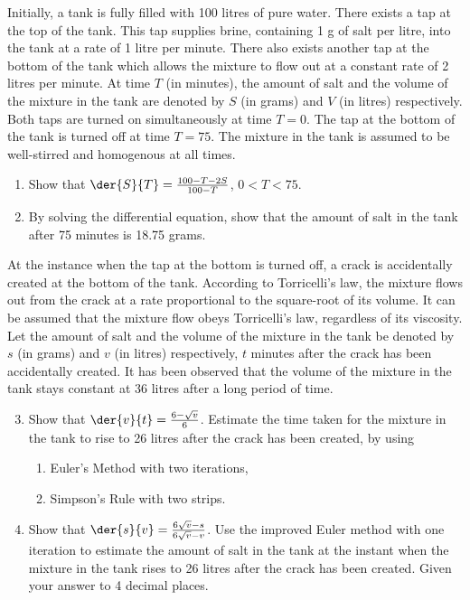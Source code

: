\begin{problem}
    Initially, a tank is fully filled with 100 litres of pure water. There exists a tap at the top of the tank. This tap supplies brine, containing 1 g of salt per litre, into the tank at a rate of 1 litre per minute. There also exists another tap at the bottom of the tank which allows the mixture to flow out at a constant rate of 2 litres per minute. At time $T$ (in minutes), the amount of salt and the volume of the mixture in the tank are denoted by $S$ (in grams) and $V$ (in litres) respectively. Both taps are turned on simultaneously at time $T = 0$. The tap at the bottom of the tank is turned off at time $T = 75$. The mixture in the tank is assumed to be well-stirred and homogenous at all times.
    \begin{enumerate}
        \item Show that $\der{S}{T} = \frac{100-T-2S}{100-T}$, $0 < T < 75$.
        \item By solving the differential equation, show that the amount of salt in the tank after 75 minutes is 18.75 grams.
    \end{enumerate}
    At the instance when the tap at the bottom is turned off, a crack is accidentally created at the bottom of the tank. According to Torricelli's law, the mixture flows out from the crack at a rate proportional to the square-root of its volume. It can be assumed that the mixture flow obeys Torricelli's law, regardless of its viscosity. Let the amount of salt and the volume of the mixture in the tank be denoted by $s$ (in grams) and $v$ (in litres) respectively, $t$ minutes after the crack has been accidentally created. It has been observed that the volume of the mixture in the tank stays constant at 36 litres after a long period of time.
    \begin{enumerate}
        \setcounter{enumi}{2}
        \item Show that $\der{v}{t} = \frac{6-\sqrt{v}}{6}$. Estimate the time taken for the mixture in the tank to rise to 26 litres after the crack has been created, by using
        \begin{enumerate}
            \item Euler's Method with two iterations,
            \item Simpson's Rule with two strips.
        \end{enumerate}
        \item Show that $\der{s}{v} = \frac{6\sqrt{v} - s}{6\sqrt{v} - v}$. Use the improved Euler method with one iteration to estimate the amount of salt in the tank at the instant when the mixture in the tank rises to 26 litres after the crack has been created. Given your answer to 4 decimal places.
    \end{enumerate}
\end{problem}
